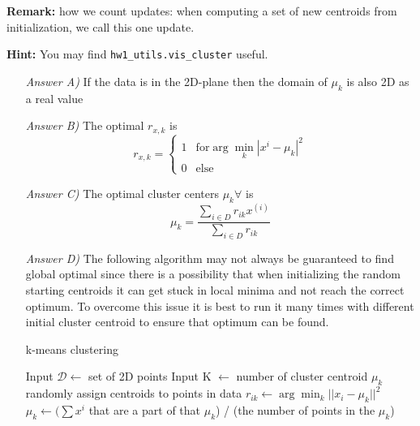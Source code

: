 \begin{Q}
\begin{enumerate}
\textbf{Remark:} how we count updates: when computing a set of new centroids from initialization, we call this one update.

\textbf{Hint:} You may find \texttt{hw1\_utils.vis\_cluster} useful.

\end{enumerate}

\begin{itemize}
\item[\textit{Answer A)}] If the data is in the 2D-plane then the domain of $\mu_k$ is also 2D as a real value
\item[\textit{Answer B)}] The optimal $r_{x,k}$  is   \begin{equation} r_{x,k} = \begin{cases} 1 & \text{for} \arg \min_{k} |x^{i} - \mu_k |^2 \\ 0 & \text{else} \end{cases} \end{equation}
\item[\textit{Answer C)}] The optimal cluster centers $\mu_k \forall$ is $$\mu_k = \frac{\sum_{i \in D} r_{ik} x^{(i)}}{\sum_{i \in D} r_{ik}}$$
\item[\textit{Answer D)}]  The following algorithm may not always be guaranteed to find global optimal since there is a possibility that when initializing the random starting centroids it can get stuck in local minima and not reach the correct optimum. To overcome this issue it is best to run it many times with different initial cluster centroid to ensure that optimum can be found.\\
\begin{algorithm} 
\caption{k-means clustering} 
\begin{algorithmic} 
\STATE Input $\mathcal{D} \leftarrow$ set of 2D points
\STATE Input K $\leftarrow$ number of cluster centroid $\mu_k$
\STATE randomly assign centroids to points in data
\REPEAT
{}
\STATE $r_{ik} \leftarrow \arg \min_k ||x_i-\mu_k||^2$
\ENDFOR
{}
\STATE $\mu_k \leftarrow (\sum x^i $ that are a part of that $\mu_k$) / (the number of points in the $\mu_k$) 
\ENDFOR
\ENDFOR
{}
\end{algorithmic} 
\end{algorithm}




\end{itemize}


\end{Q}
          